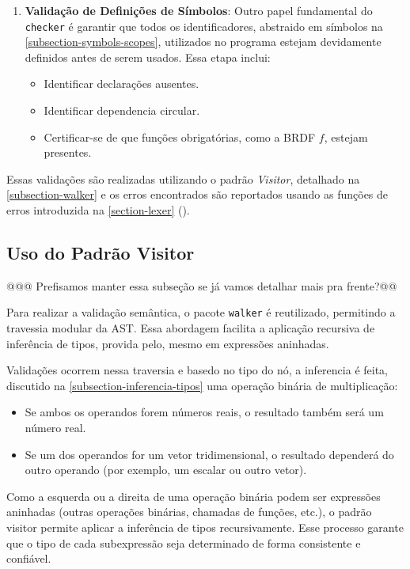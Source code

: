 \begin{enumerate}
    \item \textbf{Validação de Definições de Símbolos}:
        Outro papel fundamental do \texttt{checker} é garantir que todos os identificadores, abstraido em símbolos na \autoref{subsection-symbols-scopes}, utilizados no programa estejam devidamente definidos antes de serem usados. Essa etapa inclui:
    \begin{itemize}
        \item Identificar declarações ausentes.
        \item Identificar dependencia circular.
        \item Certificar-se de que funções obrigatórias, como a BRDF $f$, estejam presentes.
    \end{itemize}
\end{enumerate}

Essas validações são realizadas utilizando o padrão \textit{Visitor}, detalhado na \autoref{subsection-walker} e os erros encontrados são reportados usando as funções de erros introduzida na \autoref{section-lexer} (\label{function-errors}).

\subsection{Uso do Padrão Visitor}
@@@ Prefisamos manter essa subseção se já vamos detalhar mais pra frente?@@

Para realizar a validação semântica, o pacote \texttt{walker} é reutilizado, permitindo a travessia modular da AST. Essa abordagem facilita a aplicação recursiva de inferência de tipos, provida pelo, mesmo em expressões aninhadas.

Validações ocorrem nessa traversia e basedo no tipo do nó, a inferencia é feita, discutido na \autoref{subsection-inferencia-tipos} uma operação binária de multiplicação:
\begin{itemize}
    \item Se ambos os operandos forem números reais, o resultado também será um número real.
    \item Se um dos operandos for um vetor tridimensional, o resultado dependerá do outro operando (por exemplo, um escalar ou outro vetor).
\end{itemize}

Como a esquerda ou a direita de uma operação binária podem ser expressões aninhadas (outras operações binárias, chamadas de funções, etc.), o padrão visitor permite aplicar a inferência de tipos recursivamente. Esse processo garante que o tipo de cada subexpressão seja determinado de forma consistente e confiável.


